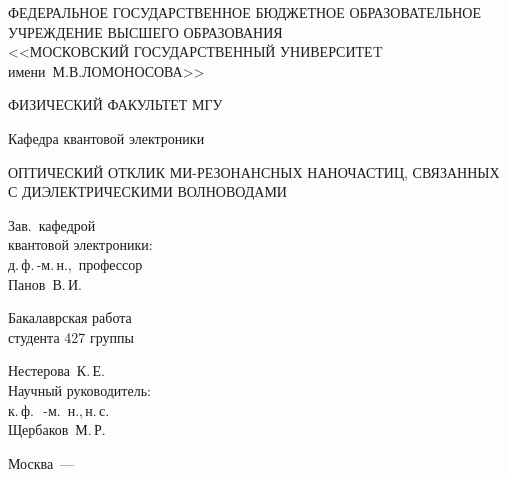 \begin{titlepage} 

	{
		\centering
		\normalsize
					
		ФЕДЕРАЛЬНОЕ ГОСУДАРСТВЕННОЕ БЮДЖЕТНОЕ ОБРАЗОВАТЕЛЬНОЕ\\ 
		УЧРЕЖДЕНИЕ ВЫСШЕГО ОБРАЗОВАНИЯ\\ 
		<<МОСКОВСКИЙ ГОСУДАРСТВЕННЫЙ УНИВЕРСИТЕT\\ 
		имени~М.В.ЛОМОНОСОВА>>
			
		\vspace{0.4 cm} 
			
		\uppercase{Физический факультет МГУ}
			
		\vspace{0.2 cm} 
			
		Кафедра квантовой электроники
		
		\par
	} 
	
	\vspace{4 cm} 
	
	{
		\centering
		\Large
		\uppercase{
			Оптический отклик Ми-резонансных наночастиц, связанных с диэлектрическими волноводами	
		}
		 
		\par
	} 
	
	\vspace{4 cm} 
	
	{
		\begin{minipage}{0.5\textwidth}
		
			\begin{flushleft}
				Зав.~кафедрой\\ 
				квантовой электроники:\\ 
				д.\,ф.\,-м.\,н.,~профессор\\ 
				Панов~В.\,И.
			\end{flushleft}	
			
		\end{minipage}
		\begin{minipage}{0.5\textwidth}
		
			\begin{flushright}
				Бакалаврская работа\\ 
				студента 427 группы\\ 
			
				\vspace{0.3 cm}
			
				Нестерова~К.\,Е.\\ 
				Научный руководитель: \\ 
				к.\,ф.\,~-м.\ н.,\,н.\,с.\\ 

				Щербаков~М.\,Р.
			\end{flushright}
			
		\end{minipage}
	} 
	
	\vfill 
	
	\centerline{Москва~— \the\year} 
	
\end{titlepage} 

\setcounter{page}{2}
\newpage